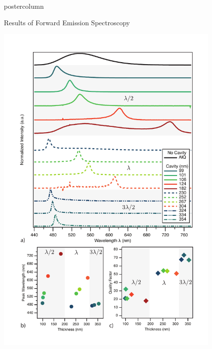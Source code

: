 \documentclass[final]{beamer}
\begin{document}
\begin{frame}
\begin{columns}
\begin{column}{.49\textwidth}
\begin{beamercolorbox}[center,wd=\textwidth]{postercolumn}
\begin{minipage}[T]{.99\textwidth}
{\begin{block}{Results of Forward Emission Spectroscopy}
\begin{minipage}{0.3\textwidth}
\begin{flushleft}
                    \end{flushleft}
                \end{minipage}
                \begin{minipage}{0.6\textwidth}
                    \centering
                    \includegraphics[width=0.835\textwidth]{images/F_N1FPPrelim.pdf}
                \end{minipage}


\end{block}}
\end{minipage}
\end{beamercolorbox}
\end{column}
\end{columns}
\end{frame}
\end{document}
